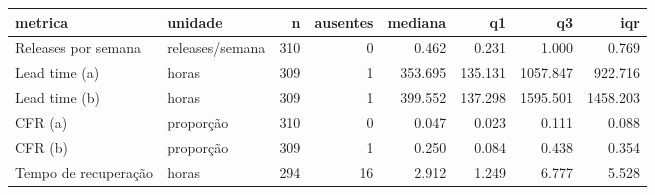 \begin{tabular}{llrrrrrr}
\toprule
metrica & unidade & n & ausentes & mediana & q1 & q3 & iqr \\
\midrule
Releases por semana & releases/semana & 310 & 0 & 0.462 & 0.231 & 1.000 & 0.769 \\
Lead time (a) & horas & 309 & 1 & 353.695 & 135.131 & 1057.847 & 922.716 \\
Lead time (b) & horas & 309 & 1 & 399.552 & 137.298 & 1595.501 & 1458.203 \\
CFR (a) & proporção & 310 & 0 & 0.047 & 0.023 & 0.111 & 0.088 \\
CFR (b) & proporção & 309 & 1 & 0.250 & 0.084 & 0.438 & 0.354 \\
Tempo de recuperação & horas & 294 & 16 & 2.912 & 1.249 & 6.777 & 5.528 \\
\bottomrule
\end{tabular}
